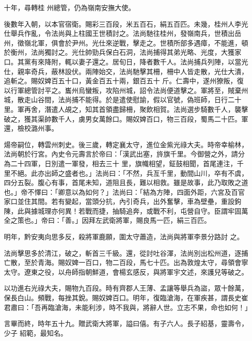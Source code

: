 \begin{pinyinscope}
 十年，尋轉桂
 州總管，仍為嶺南安撫大使。



 後數年入朝，以本官宿衛。賜彩三百段，米五百石，絹五百匹。未幾，桂州人李光仕舉兵作亂，令法尚與上柱國王世積討之。法尚馳往桂州，發嶺南兵，世積出岳州，徵嶺北軍，俱會於尹州。光仕來逆戰，擊走之。世積所部多遇瘴，不能進，頓於衡州，法尚獨討之。光仕帥勁兵保白石洞，法尚捕得其弟光略、光度，大獲家口。其黨有來降附，輒以妻子還之。居旬日，降者數千人。法尚捕兵列陣，以當光仕，親率奇兵，蔽林設伏。兩陣始交，法尚馳擊其柵，柵中人皆走散，光仕大潰，追斬之。賜奴婢百五十口，黃金百五十兩，銀百五十
 斤。仁壽中，遂州獠叛，復以行軍總管討平之。巂州烏蠻叛，攻陷州城，詔令法尚便道擊之。軍將至，賊棄州城，散走山谷間，法尚捕不能得。於是遣使慰諭，假以官號，偽班師，日行二十里。軍再舍，潛遣人覘之，知其首領盡歸柵，聚飲相賀。法尚選步騎數千人，襲擊破之，獲其渠帥數千人，虜男女萬餘口。賜奴婢百口，物三百段，蜀馬二十匹。軍還，檢校潞州事。



 煬帝嗣位，轉雲州刺史。後三歲，轉定襄太守，進位金紫光祿大夫。時帝幸榆林，法尚朝於行宮。內史令元壽言於帝曰：「漢武出塞，旍旗千里。今御營之外，請分為二十四軍，日別遣一軍發，相去三十
 里，旗幟相望，鉦鼓相聞，首尾連注，千里不絕。此亦出師之盛者也。」法尚曰：「不然，兵亙千里，動間山川，卒有不虞，四分五裂。腹心有事，首尾未知，道阻且長，難以相救。雖是故事，此乃取敗之道也。」帝不懌曰：「卿意以為如何？」法尚曰：「結為方陣，四面外距，六宮及百官家口並住其間。若有變起，當頭分抗，內引奇兵，出外奮擊，車為壁壘，重設鉤陳，此與據城理亦何異！若戰而捷，抽騎追奔，或戰不利，屯營自守。臣謂牢固萬全之策也。」帝曰：「善。」因拜左武衛將軍，賜良馬一匹，絹三百匹。



 明年，黔安夷向思多反，殺將軍鹿願，圍太守蕭造，法尚與將軍李景分路討
 之。



 法尚擊思多於清江，破之，斬首三千級。還，從討吐谷渾，法尚別出松州道，逐捕亡散，至於青海。賜奴婢一百口，物二百段，馬七十匹。出為敦煌太守，尋領會寧太守。遼東之役，以舟師指朝鮮道，會楊玄感反，與將軍宇文述，來護兒等破之。



 以功進右光祿大夫，賜物九百段。時有齊郡人王薄、孟讓等舉兵為盜，眾十餘萬，保長白山。頻戰，每挫其銳。賜奴婢百口。明年，復臨滄海，在軍疾甚，謂長史崔君肅曰：「吾再臨滄海，未能利涉，時不我與，將辭人世。立志不果，命也如何！」



 言畢而終，時年五十九。贈武衛大將軍，謚曰僖。有子六人。長子紹基，靈壽令，少子
 紹範，最知名。




\end{pinyinscope}
